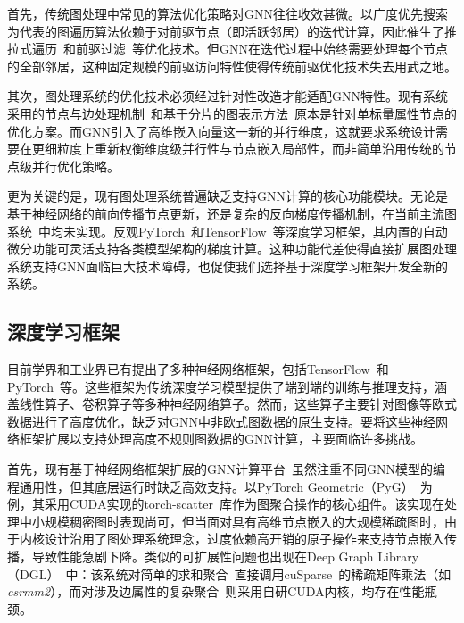 首先，传统图处理中常见的算法优化策略对GNN往往收效甚微。以广度优先搜索为代表的图遍历算法依赖于对前驱节点（即活跃邻居）的迭代计算，因此催生了推拉式遍历~\cite{liu2015enterprise,liu2019simd}和前驱过滤~\cite{liu2015enterprise,liu2019simd,wang2016gunrock}等优化技术。但GNN在迭代过程中始终需要处理每个节点的全部邻居，这种固定规模的前驱访问特性使得传统前驱优化技术失去用武之地。

其次，图处理系统的优化技术必须经过针对性改造才能适配GNN特性。现有系统采用的节点与边处理机制~\cite{wang2016gunrock,liu2019simd}和基于分片的图表示方法~\cite{khorasani2014cusha}原本是针对单标量属性节点的优化方案。而GNN引入了高维嵌入向量这一新的并行维度，这就要求系统设计需要在更细粒度上重新权衡维度级并行性与节点嵌入局部性，而非简单沿用传统的节点级并行优化策略。

更为关键的是，现有图处理系统普遍缺乏支持GNN计算的核心功能模块。无论是基于神经网络的前向传播节点更新，还是复杂的反向梯度传播机制，在当前主流图系统~\cite{khorasani2014cusha, Tigr,wang2016gunrock,liu2015enterprise,liu2019simd,kyrola2012graphchi, x-stream}中均未实现。反观PyTorch~\cite{pytorch}和TensorFlow~\cite{tensorflow2015}等深度学习框架，其内置的自动微分功能可灵活支持各类模型架构的梯度计算。这种功能代差使得直接扩展图处理系统支持GNN面临巨大技术障碍，也促使我们选择基于深度学习框架开发全新的系统。

\subsection{深度学习框架}

目前学界和工业界已有提出了多种神经网络框架，包括TensorFlow~\cite{tensorflow2015}和PyTorch~\cite{pytorch}等。这些框架为传统深度学习模型提供了端到端的训练与推理支持，涵盖线性算子、卷积算子等多种神经网络算子。然而，这些算子主要针对图像等欧式数据进行了高度优化，缺乏对GNN中非欧式图数据的原生支持。要将这些神经网络框架扩展以支持处理高度不规则图数据的GNN计算，主要面临许多挑战。

首先，现有基于神经网络框架扩展的GNN计算平台~\cite{pyG,wang2019dgl}虽然注重不同GNN模型的编程通用性，但其底层运行时缺乏高效支持。以PyTorch Geometric（PyG）~\cite{pyG}为例，其采用CUDA实现的torch-scatter~\cite{torch-scatter}库作为图聚合操作的核心组件。该实现在处理中小规模稠密图时表现尚可，但当面对具有高维节点嵌入的大规模稀疏图时，由于内核设计沿用了图处理系统理念，过度依赖高开销的原子操作来支持节点嵌入传播，导致性能急剧下降。类似的可扩展性问题也出现在Deep Graph Library（DGL）~\cite{wang2019dgl}中：该系统对简单的求和聚合~\cite{GCNConv,SageConv}直接调用cuSparse~\cite{cusparse}的稀疏矩阵乘法（如\textit{csrmm2}），而对涉及边属性的复杂聚合~\cite{GINConv,GATConv}则采用自研CUDA内核，均存在性能瓶颈。

